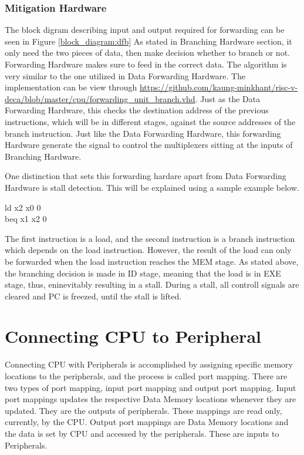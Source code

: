 \subsubsection{Mitigation Hardware}
The block digram describing input and output required for forwarding can be seen in Figure \ref{block_diagram:dfb}
As stated in Branching Hardware section, it only need the two pieces of data, then make decision whether to branch or not.
Forwarding Hardware makes sure to feed in the correct data. The algorithm is very similar to the one utilized in Data Forwarding Hardware.
The implementation can be view through \url{https://github.com/kaung-minkhant/risc-v-deca/blob/master/cpu/forwarding_unit_branch.vhd}.
Just as the Data Forwarding Hardware, this checks the destination address of the previous instructions, which will be in different stages, against
the source addresses of the branch instruction.
Just like the Data Forwarding Hardware, this forwarding Hardware generate the signal to control the multiplexers sitting at the inputs of Branching Hardware.

One distinction that sets this forwarding hardare apart from Data Forwarding Hardware is stall detection.
This will be explained using a sample example below.
\begin{center}
    ld x2 x0 0 \\
    beq x1 x2 0
\end{center}

The first instruction is a load, and the second instruction is a branch instruction which depends on the load instruction.
However, the result of the load can only be forwarded when the load instruction reaches the MEM stage.
As stated above, the branching decision is made in ID stage, meaning that the load is in EXE stage, thus, eninevitably resulting in a stall.
During a stall, all controll signals are cleared and PC is freezed, until the stall is lifted.

\newpage
\section{Connecting CPU to Peripheral}
Connecting CPU with Peripherals is accomplished by assigning specific memory locations to the peripherals, and the process is called port mapping.
There are two types of port mapping, input port mapping and output port mapping.
Input port mappings updates the respective Data Memory locations whenever they are updated.
They are the outputs of peripherals.
These mappings are read only, currently, by the CPU.
Output port mappings are Data Memory locations and the data is set by CPU and accessed by the peripherals.
These are inputs to Peripherals.

